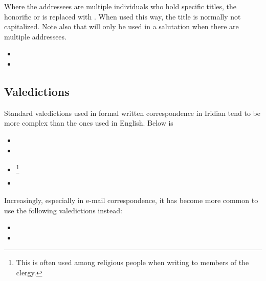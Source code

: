 Where the addressees are multiple individuals who hold specific titles, the honorific  or  is replaced with . When used this way, the title is normally not capitalized. Note also that  will only be used in a salutation when there are multiple addressees.

\begin{itemize}[nosep]
	\item {}
	\item {}
\end{itemize}

\subsection{Valedictions}

Standard valedictions used in formal written correspondence in Iridian tend to be more complex than the ones used in English. Below is 

\begin{itemize}[nosep]
	\item {}
	\item {}
	\item {}\footnote{This is often used among religious people when writing to members of the clergy.}
	\item {}

\end{itemize}

Increasingly, especially in e-mail correspondence, it has become more common to use the following valedictions instead:

\begin{itemize}[nosep]
	\item {}
	\item {}
\end{itemize}

